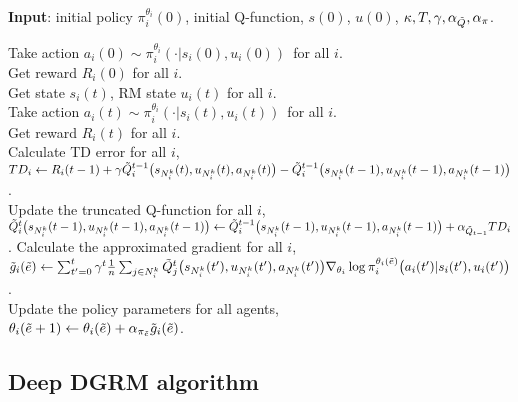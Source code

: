 \documentclass[conf]{new-aiaa}
\def\foo ABC{DGRM}
\begin{document}
\begin{algorithm}[tb]
\textbf{Input}: initial policy $\pi_i^{\theta_i}(0)$, initial Q-function, $s(0)$, $u(0)$, $\kappa, T, \gamma, \alpha_{\Tilde{Q}}, \alpha_\pi$.
\begin{algorithmic}[1]
 \STATE
 Take action $a_i(0) \sim \pi_i^{\theta_i}(\cdot | s_i(0), u_i(0))$\ for all $i$.\\
 \STATE Get reward $R_i(0)$ for all $i$.\\
  \STATE Get state $s_i(t)$, RM state $u_i(t)$ for all $i$.\\
  \STATE Take action $a_i(t) \sim \pi_i^{\theta_i}(\cdot | s_i(t), u_i(t))$\ for all $i$.\\
  \STATE Get reward $R_i(t)$ for all $i$.\\
  \STATE Calculate TD error for all $i$,\\
  \STATE $TD_i \gets R_i(t-1) + \gamma \Tilde{Q}_i^{t-1} \big( s_{N_i^k}(t), u_{N_i^k}(t),  a_{N_i^k} (t)\big)- \Tilde{Q}_i^{t-1}\big(s_{N_i^k}(t-1), u_{N_i^k}(t-1), a_{N_i^k}(t-1)\big)$. \\
  \STATE Update the truncated Q-function for all $i$,\\
  \STATE $\Tilde{Q}_i^{t}\big(s_{N_i^k}(t-1), u_{N_i^k}(t-1), a_{N_i^k}(t-1)\big) \gets \Tilde{Q}_i^{t-1}\big(s_{N_i^k}(t-1), u_{N_i^k}(t-1), a_{N_i^k}(t-1)\big) + \alpha_{{\Tilde{Q}}_{t-1}} TD_i$.
  \ENDWHILE
  \STATE Calculate the approximated gradient for all $i$,\\
  \STATE $\Tilde{g}_i(\Tilde{e}) \gets  \sum_{t'=0}^t \gamma^t \frac{1}{n} \sum_{j \in N_i^k} \Tilde{Q}_j^t \big (s_{N_i^k}(t'), u_{N_i^k}(t'), a_{N_i^k}(t')\big) \nabla_{\theta_i} \log  \pi_i^{\theta_i(\Tilde{e})}\big(a_i(t')|s_i(t'), u_i(t')\big)$.\\
  \STATE Update the policy parameters for all agents,\\
  \STATE $\theta_i(\Tilde{e}+1) \gets \theta_i(\Tilde{e}) + \alpha_{\pi_{\Tilde{e}}} \Tilde{g}_i(\Tilde{e}) $.
\ENDFOR
\end{algorithmic}
\caption{\foo ABC Algorithm}
\label{alg:alg1}
\end{algorithm}


\subsection{Deep \foo ABC algorithm}
\end{document}

